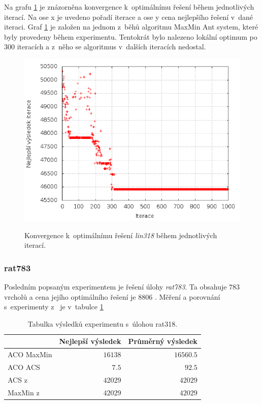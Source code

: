 \documentclass[a4paper, 12pt]{article}
\begin{document}
Na grafu \ref{fig:best_lin} je znázorněna konvergence k~optimálnímu řešení během jednotlivých iterací. Na ose x je uvedeno pořadí iterace a ose y
cena nejlepšího řešení v~dané iteraci. Graf \ref{fig:best_lin} je založen na jednom z~běhů algoritmu MaxMin Ant system, které byly provedeny během experimentu.
Tentokrát bylo nalezeno lokální optimum po 300 iteracích a z~něho se algoritmus v~dalších iteracích nedostal.
\begin{figure}[bt]
\begin{center}
\scalebox{0.6}
{
  \includegraphics{imgs/best_lin.png}
}
\caption{
Konvergence k~optimálnímu řešení \emph{lin318} během jednotlivých iterací.}
\label{fig:best_lin}
\end{center}
\end{figure}

\subsubsection{rat783}
Posledním popsaným experimentem je řešení úlohy \emph{rat783}. Ta obsahuje $783$ vrcholů a cena jejího optimálního řešení je $8 806$ \cite{aco:acs}. 
Měření a porovnání s~experimenty z~\cite{aco:maxmintsp,aco:acs} je v~tabulce \ref{rat783}
\begin{table}[tb]
\begin{center}
  \begin{tabular}{ | l | r | r |}
   \hline
    & \textbf{Nejlepší výsledek} & \textbf{Průměrný výsledek} \\ \hline \hline
    ACO MaxMin & $16138$ & $16560.5$ \\ \hline
    ACO ACS & $7.5$ & $92.5$ \\ \hline
    ACS z~\cite{aco:acs} & $42 029$ & $42 029$ \\ \hline
    MaxMin z~\cite{aco:maxmintsp} & $42 029$ & $42 029$\\ \hline
   \end{tabular}
   \caption{Tabulka výsledků experimentu s~úlohou rat318.}
   \label{rat783}
\end{center}
\end{table}
\end{document}
